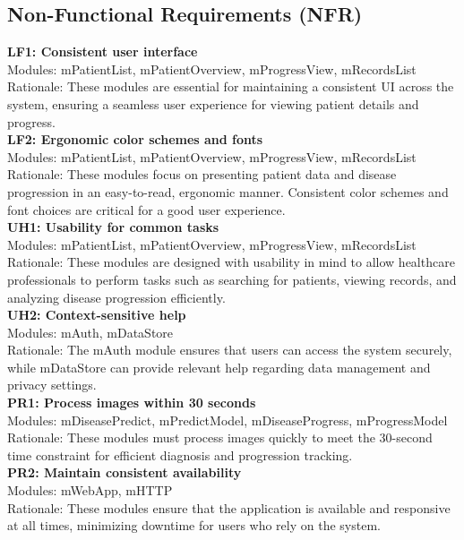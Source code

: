 \documentclass[12pt, titlepage]{article}
\begin{document}
\subsection{Non-Functional Requirements (NFR)}
\textbf{LF1: Consistent user interface} \\
Modules: mPatientList, mPatientOverview, mProgressView, mRecordsList \\
Rationale: These modules are essential for maintaining a consistent UI across the system, ensuring a seamless user experience for viewing patient details and progress. \\
\textbf{LF2: Ergonomic color schemes and fonts} \\
Modules: mPatientList, mPatientOverview, mProgressView, mRecordsList \\
Rationale: These modules focus on presenting patient data and disease progression in an easy-to-read, ergonomic manner. Consistent color schemes and font choices are critical for a good user experience. \\
\textbf{UH1: Usability for common tasks} \\
Modules: mPatientList, mPatientOverview, mProgressView, mRecordsList \\
Rationale: These modules are designed with usability in mind to allow healthcare professionals to perform tasks such as searching for patients, viewing records, and analyzing disease progression efficiently. \\
\textbf{UH2: Context-sensitive help} \\
Modules: mAuth, mDataStore \\
Rationale: The mAuth module ensures that users can access the system securely, while mDataStore can provide relevant help regarding data management and privacy settings. \\
\textbf{PR1: Process images within 30 seconds} \\
Modules: mDiseasePredict, mPredictModel, mDiseaseProgress, mProgressModel \\
Rationale: These modules must process images quickly to meet the 30-second time constraint for efficient diagnosis and progression tracking. \\
\textbf{PR2: Maintain consistent availability} \\
Modules: mWebApp, mHTTP \\
Rationale: These modules ensure that the application is available and responsive at all times, minimizing downtime for users who rely on the system. \\
\end{document}
